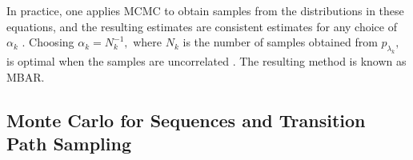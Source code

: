 \documentclass{article}
\newcommand{\bias}{\lambda}
\newcommand{\pdf}{p}
\begin{document}
In practice, one applies MCMC to obtain samples from the distributions in these equations, and the resulting estimates are consistent estimates for any choice of $\alpha_k$ \cite{dinner2020stratification}. Choosing $\alpha_k = N_k^{-1},$ where $N_k$ is the number of samples obtained from $\pdf_{\bias_k},$ is optimal when the samples are uncorrelated \cite{shirts2008statistically}. The resulting method is known as MBAR.

\subsection{Monte Carlo for Sequences and Transition Path Sampling}



\end{document}
